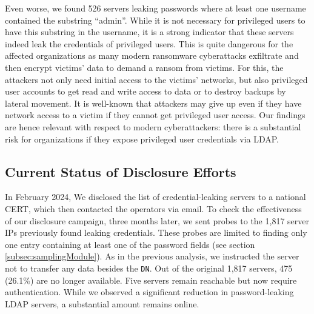 Even worse, we found 526 servers leaking passwords where at least one username contained the substring ``admin''. While it is not necessary for privileged users to have this substring in the username, it is a strong indicator that these servers indeed leak the credentials of privileged users. This is quite dangerous for the affected organizations as many modern ransomware cyberattacks exfiltrate and then encrypt victims' data to demand a ransom from victims. For this, the attackers not only need initial access to the victims' networks, but also privileged user accounts to get read and write access to data or to destroy backups by lateral movement. It is well-known that attackers may give up even if they have network access to a victim if they cannot get privileged user access. Our findings are hence relevant with respect to modern cyberattackers: there is a substantial risk for organizations if they expose privileged user credentials via LDAP.

\subsection{Current Status of Disclosure Efforts}

In February 2024, We disclosed the list of credential-leaking servers to a national CERT, which then contacted the operators via email. To check the effectiveness of our disclosure campaign, three months later, we sent probes to the 1,817 server IPs previously found leaking credentials. These probes are limited to finding only one entry containing at least one of the password fields (see section \ref{subsec:samplingModule}). As in the previous analysis, we instructed the server not to transfer any data besides the \texttt{DN}. Out of the original 1,817 servers, 475 (26.1\%) are no longer available. Five servers remain reachable but now require authentication. 
While we observed a significant reduction in password-leaking LDAP servers, a substantial amount remains online.